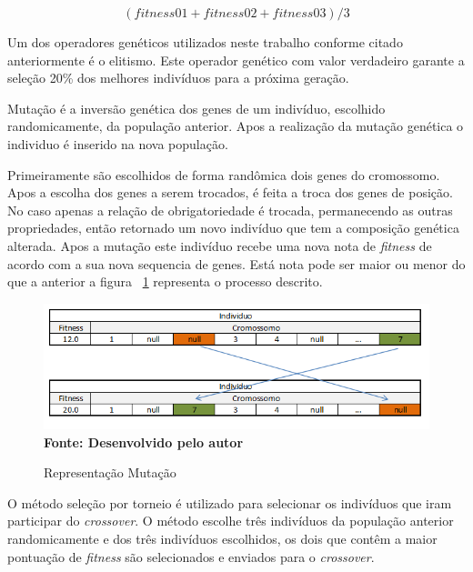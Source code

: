 $$ (fitness01+fitness02+fitness03)/3 $$ 




Um dos operadores genéticos utilizados neste trabalho conforme citado anteriormente é o elitismo. Este operador genético com valor verdadeiro garante a seleção 20\% dos melhores indivíduos para a próxima geração.\par

Mutação é a inversão genética dos genes de um indivíduo, escolhido randomicamente, da população anterior. Apos a realização da mutação genética o individuo é inserido na nova população.\par

Primeiramente são escolhidos de forma randômica dois genes do cromossomo. Apos a escolha dos genes a serem trocados, é feita a troca dos genes de posição. No caso apenas a relação de obrigatoriedade é trocada, permanecendo as outras propriedades, então retornado um novo indivíduo que tem a composição genética alterada. Apos a mutação este indivíduo recebe uma nova nota de \textit{fitness} de acordo com a sua nova sequencia de genes. Está nota pode ser maior ou menor do que a anterior a figura ~\ref{fig:mutacao} representa o processo descrito.\par

\begin{figure}[!htb]
\caption[Representação Mutação]{Representação Mutação}
\label{fig:mutacao}
\centering
\includegraphics[scale=0.7]{imagens/representacaoMutacao.png}
\\ \textbf{\footnotesize Fonte: Desenvolvido pelo autor}
\end{figure}

O método seleção por torneio é utilizado para selecionar os indivíduos que iram participar do \textit{crossover}. O método escolhe três indivíduos da população anterior randomicamente e dos três indivíduos escolhidos, os dois que contêm a maior pontuação de \textit{fitness} são selecionados e enviados para o \textit{crossover}.\par

